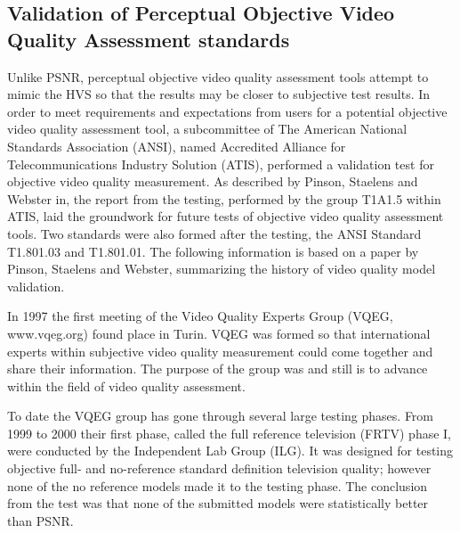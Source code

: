 \subsection{Validation of Perceptual Objective Video Quality Assessment standards}\label{sect:validation}
Unlike PSNR, perceptual objective video quality assessment tools attempt to mimic the HVS so that the results may be closer to subjective test results. In order to meet requirements and expectations from users for a potential objective video quality assessment tool, a subcommittee of The American National Standards Association (ANSI), named Accredited Alliance for Telecommunications Industry Solution (ATIS), performed a validation test for objective video quality measurement. As described by Pinson, Staelens and Webster in\cite{6659332}, the report\cite{T1A1.5} from the testing, performed by the group T1A1.5 within ATIS, laid the groundwork for future tests of objective video quality assessment tools. Two standards were also formed after the testing, the ANSI Standard T1.801.03 and T1.801.01. The following information is based on a paper by Pinson, Staelens and Webster\cite{6659332}, summarizing the history of video quality model validation.

In 1997 the first meeting of the Video Quality Experts Group (VQEG, www.vqeg.org) found place in Turin. VQEG was formed so that international experts within subjective video quality measurement could come together and share their information. The purpose of the group was and still is to advance within the field of video quality assessment.

To date the VQEG group has gone through several large testing phases. From 1999 to 2000 their first phase, called the full reference television (FRTV) phase I, were conducted by the Independent Lab Group (ILG). It was designed for testing objective full- and no-reference standard definition television quality; however none of the no reference models made it to the testing phase. The conclusion from the test was that none of the submitted models were statistically better than PSNR.

